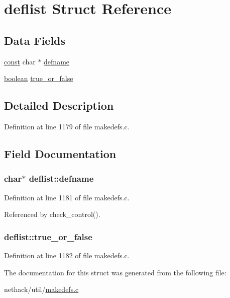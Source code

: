 \hypertarget{structdeflist}{\section{deflist Struct Reference}
\label{structdeflist}
}
\subsection*{Data Fields}
\begin{DoxyCompactItemize}
\item 
\hyperlink{tradstdc_8h_a2c212835823e3c54a8ab6d95c652660e}{const} char $\ast$ \hyperlink{structdeflist_ac2b925dd4885465d7911a99f1e1fad32}{defname}
\item 
\hyperlink{global_8h_a531b10dd351aa162d7dcccd1966308b8}{boolean} \hyperlink{structdeflist_ad9386218755e495a316b6583a0eff9a3}{true\+\_\+or\+\_\+false}
\end{DoxyCompactItemize}


\subsection{Detailed Description}


Definition at line 1179 of file makedefs.\+c.



\subsection{Field Documentation}
\hypertarget{structdeflist_ac2b925dd4885465d7911a99f1e1fad32}{
\subsubsection[{defname}]{ char$\ast$ deflist\+::defname}}\label{structdeflist_ac2b925dd4885465d7911a99f1e1fad32}


Definition at line 1181 of file makedefs.\+c.



Referenced by check\+\_\+control().

\hypertarget{structdeflist_ad9386218755e495a316b6583a0eff9a3}{
\subsubsection[{true\+\_\+or\+\_\+false}]{ deflist\+::true\+\_\+or\+\_\+false}}\label{structdeflist_ad9386218755e495a316b6583a0eff9a3}


Definition at line 1182 of file makedefs.\+c.



The documentation for this struct was generated from the following file\+:\begin{DoxyCompactItemize}
\item 
nethack/util/\hyperlink{makedefs_8c}{makedefs.\+c}\end{DoxyCompactItemize}
